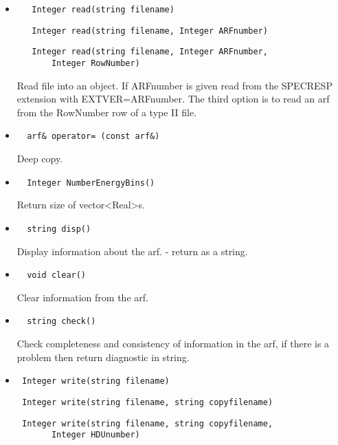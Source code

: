 \documentclass[11pt]{book}
\begin{document}
\begin{itemize}

\item  \begin{verbatim}   Integer read(string filename) \end{verbatim}
       \begin{verbatim}   Integer read(string filename, Integer ARFnumber) \end{verbatim}
       \begin{verbatim}   Integer read(string filename, Integer ARFnumber,
       Integer RowNumber) \end{verbatim}

          Read file into an object. If ARFnumber is given read from
          the SPECRESP extension with EXTVER=ARFnumber. The third
          option is to read an arf from the RowNumber row of a 
          type II file.

\item  \begin{verbatim}  arf& operator= (const arf&) \end{verbatim}

          Deep copy.

\item  \begin{verbatim}  Integer NumberEnergyBins() \end{verbatim}

          Return size of vector<Real>s.

\item  \begin{verbatim}  string disp() \end{verbatim}

          Display information about the arf. - return as a string.

\item  \begin{verbatim}  void clear() \end{verbatim}

          Clear information from the arf.

\item  \begin{verbatim}  string check() \end{verbatim}

          Check completeness and consistency of information in the arf,
          if there is a problem then return diagnostic in string.

\item  \begin{verbatim} Integer write(string filename) \end{verbatim}
       \begin{verbatim} Integer write(string filename, string copyfilename) \end{verbatim}
       \begin{verbatim} Integer write(string filename, string copyfilename,
       Integer HDUnumber) \end{verbatim}


\end{itemize}
\end{document}
